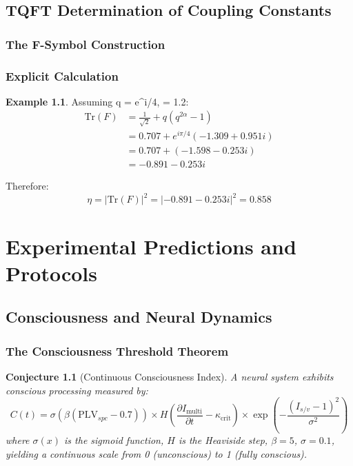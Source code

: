 \documentclass[openany]{memoir}
\theoremstyle{definition}
\newtheorem{example}[definition]{Example}
\theoremstyle{plain}
\newtheorem{conjecture}[definition]{Conjecture}
\theoremstyle{remark}
\newcommand{\Imulti}{I_{\text{multi}}}
\newcommand{\Isv}{I_{s/v}}
\begin{document}
\chapter{TQFT Determination of Coupling Constants}

\section{The F-Symbol Construction}

\section{Explicit Calculation}

\begin{example}
Assuming q = e^{i\pi/4}, \alpha = 1.2:
\begin{align}
\text{Tr}(F) &= \frac{1}{\sqrt{2}} + q(q^{2\alpha} - 1) \\
&= 0.707 + e^{i\pi/4}(-1.309 + 0.951i) \\
&= 0.707 + (-1.598 - 0.253i) \\
&= -0.891 - 0.253i
\end{align}

Therefore:
\begin{equation}
\eta = |\text{Tr}(F)|^2 = |-0.891 - 0.253i|^2 = 0.858
\end{equation}
\end{example}

\part{Experimental Predictions and Protocols}

\chapter{Consciousness and Neural Dynamics}

\section{The Consciousness Threshold Theorem}

\begin{conjecture}[Continuous Consciousness Index]
A neural system exhibits conscious processing measured by:
\begin{equation}
C(t) = \sigma\left(\beta (\text{PLV}_{spc} - 0.7)\right) \times H\left(\frac{\partial \Imulti}{\partial t} - \kappa_{\text{crit}}\right) \times \exp\left(-\frac{(\Isv - 1)^2}{\sigma^2}\right)
\end{equation}
where $\sigma(x)$ is the sigmoid function, $H$ is the Heaviside step, $\beta = 5$, $\sigma = 0.1$, yielding a continuous scale from 0 (unconscious) to 1 (fully conscious).
\end{conjecture}
\end{document}

